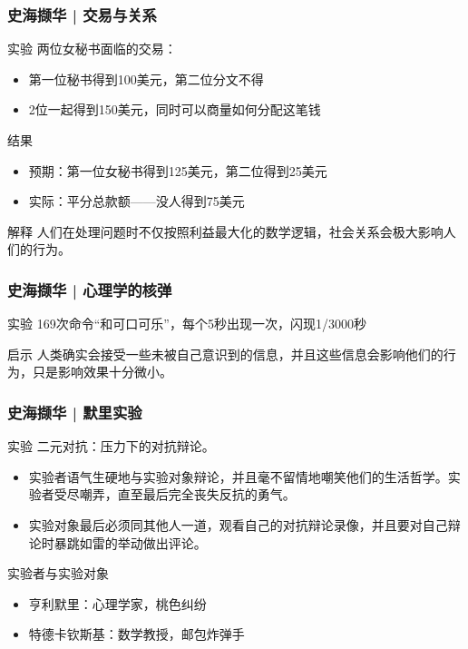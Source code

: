 \begin{frame}
  \frametitle{史海撷华 | 交易与关系}
  \begin{block}{实验}
    两位女秘书面临的交易：
    \begin{itemize}
      \item 第一位秘书得到100美元，第二位分文不得
      \item 2位一起得到150美元，同时可以商量如何分配这笔钱
    \end{itemize}
  \end{block}
  \pause
  \begin{block}{结果}
    \begin{itemize}
      \item 预期：第一位女秘书得到125美元，第二位得到25美元
      \item 实际：平分总款额——没人得到75美元
    \end{itemize}
  \end{block}
  \pause
  \begin{block}{解释}
    人们在处理问题时不仅按照利益最大化的数学逻辑，社会关系会极大影响人们的行为。
  \end{block}
\end{frame}

\begin{frame}
  \frametitle{史海撷华 | 心理学的核弹}
  \begin{block}{实验}
    169次命令“和可口可乐”，每个5秒出现一次，闪现1/3000秒
  \end{block}
  \pause
  \begin{block}{启示}
    人类确实会接受一些未被自己意识到的信息，并且这些信息会影响他们的行为，只是影响效果十分微小。
  \end{block}
\end{frame}

\begin{frame}
  \frametitle{史海撷华 | 默里实验}
  \begin{block}{实验}
    二元对抗：压力下的对抗辩论。
    \begin{itemize}
      \item 实验者语气生硬地与实验对象辩论，并且毫不留情地嘲笑他们的生活哲学。实验者受尽嘲弄，直至最后完全丧失反抗的勇气。
      \item 实验对象最后必须同其他人一道，观看自己的对抗辩论录像，并且要对自己辩论时暴跳如雷的举动做出评论。
    \end{itemize}
  \end{block}
  \pause
  \begin{block}{实验者与实验对象}
    \begin{itemize}
      \item 亨利\textbullet 默里：心理学家，桃色纠纷
      \item 特德\textbullet 卡钦斯基：数学教授，邮包炸弹手
    \end{itemize}
  \end{block}
\end{frame}

